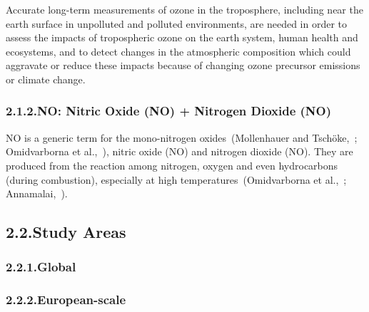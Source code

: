 \documentclass[9pt]{report}
\begin{document}
Accurate long-term measurements of ozone in the troposphere, including near the earth surface in unpolluted and polluted environments, are needed in order to assess the impacts of tropospheric ozone on the earth system, human health and ecosystems, and to detect changes in the atmospheric composition which could aggravate or reduce these impacts because of changing ozone precursor emissions or climate change.%

\subsubsection{2.1.2.\hspace*{0.5em}NO: Nitric Oxide (NO) + Nitrogen Dioxide (NO)}\label{sec-nox--nitric-oxide-no-nitrogen-dioxide-no2}%

\noindent{}NO is a generic term for the mono-nitrogen oxides~(Mollenhauer and Tschöke,~; Omidvarborna et al.,~), nitric oxide (NO) and nitrogen dioxide (NO).
They are produced from the reaction among nitrogen, oxygen and even hydrocarbons (during combustion), especially at high temperatures~(Omidvarborna et al.,~; Annamalai,~).%

\subsection{2.2.\hspace*{0.5em}Study Areas}\label{sec-study-areas}%

\subsubsection{2.2.1.\hspace*{0.5em}Global}\label{sec-global}%

\subsubsection{2.2.2.\hspace*{0.5em}European-scale}\label{sec-european-scale}%
\end{document}
